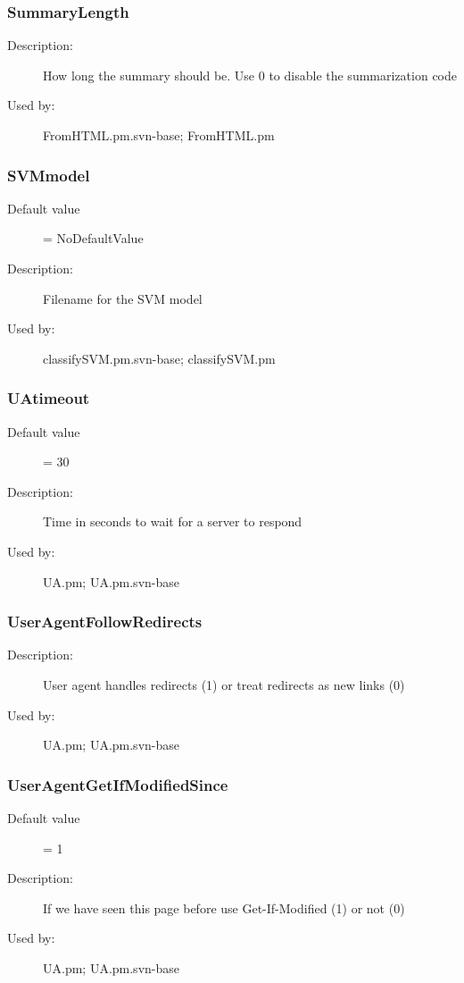 \subsubsection{SummaryLength}
\label{SummaryLength}
\begin{description}
\item[Description:] How long the summary should be. Use 0 to disable the summarization code
\item[Used by:] FromHTML.pm.svn-base; FromHTML.pm
\end{description}
\subsubsection{SVMmodel}
\label{SVMmodel}
\begin{description}
\item[Default value] = NoDefaultValue
\item[Description:] Filename for the SVM model
\item[Used by:] classifySVM.pm.svn-base; classifySVM.pm
\end{description}
\subsubsection{UAtimeout}
\label{UAtimeout}
\begin{description}
\item[Default value] = 30
\item[Description:] Time in seconds to wait for a server to respond
\item[Used by:] UA.pm; UA.pm.svn-base
\end{description}
\subsubsection{UserAgentFollowRedirects}
\label{UserAgentFollowRedirects}
\begin{description}
\item[Description:] User agent handles redirects (1) or treat redirects as new links (0)
\item[Used by:] UA.pm; UA.pm.svn-base
\end{description}
\subsubsection{UserAgentGetIfModifiedSince}
\label{UserAgentGetIfModifiedSince}
\begin{description}
\item[Default value] = 1
\item[Description:] If we have seen this page before use Get-If-Modified (1) or not (0)
\item[Used by:] UA.pm; UA.pm.svn-base
\end{description}
